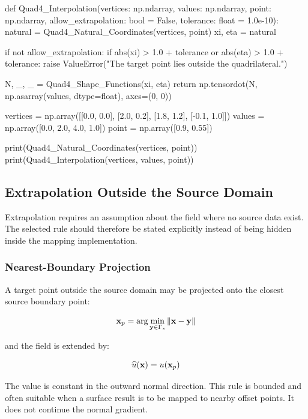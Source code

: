 \begin{python}
def Quad4_Interpolation(vertices: np.ndarray,
                        values: np.ndarray,
                        point: np.ndarray,
                        allow_extrapolation: bool = False,
                        tolerance: float = 1.0e-10):
    natural = Quad4_Natural_Coordinates(vertices, point)
    xi, eta = natural

    if not allow_extrapolation:
        if abs(xi) > 1.0 + tolerance or abs(eta) > 1.0 + tolerance:
            raise ValueError("The target point lies outside the quadrilateral.")

    N, _, _ = Quad4_Shape_Functions(xi, eta)
    return np.tensordot(N, np.asarray(values, dtype=float), axes=(0, 0))


vertices = np.array([[0.0, 0.0],
                     [2.0, 0.2],
                     [1.8, 1.2],
                     [-0.1, 1.0]])
values = np.array([0.0, 2.0, 4.0, 1.0])
point = np.array([0.9, 0.55])

print(Quad4_Natural_Coordinates(vertices, point))
print(Quad4_Interpolation(vertices, values, point))
\end{python}

\subsection{Extrapolation Outside the Source Domain}

Extrapolation requires an assumption about the field where no source data
exist. The selected rule should therefore be stated explicitly instead of
being hidden inside the mapping implementation.

\subsubsection{Nearest-Boundary Projection}

A target point outside the source domain may be projected onto the closest
source boundary point:

\begin{equation}
    \mathbf{x}_p = \arg\min_{\mathbf{y}\in\Gamma_s}
    \| {\mathbf{x}-\mathbf{y}} \|
\end{equation}

and the field is extended by:

\begin{equation}
    \widehat{u}(\mathbf{x}) = u(\mathbf{x}_p)
\end{equation}

The value is constant in the outward normal direction. This rule is bounded
and often suitable when a surface result is to be mapped to nearby offset
points. It does not continue the normal gradient.

